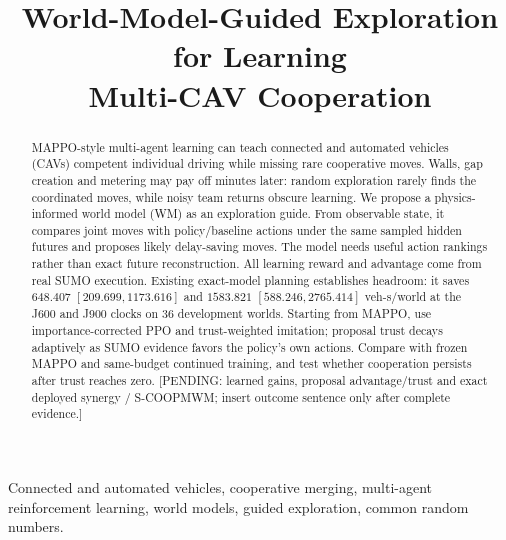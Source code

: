 \documentclass[conference]{IEEEtran}
\newcommand{\pending}[1]{\textcolor{red!80!black}{[PENDING: #1]}}
\begin{document}
\title{World-Model-Guided Exploration for Learning\\Multi-CAV Cooperation}
\author{
}
\maketitle

\begin{abstract}
MAPPO-style multi-agent learning can teach connected and automated vehicles
(CAVs) competent individual driving while missing rare cooperative moves.
Walls, gap creation and metering may pay off minutes later: random exploration
rarely finds the coordinated moves, while noisy team returns obscure learning.
We propose a physics-informed world model (WM) as an exploration guide.
From observable state, it compares joint moves with policy/baseline actions
under the same sampled hidden futures and proposes likely delay-saving moves.
The model needs useful action rankings rather than exact future reconstruction.
All learning reward and advantage come from real SUMO execution.
Existing exact-model planning establishes
headroom: it saves
$648.407$ $[209.699,1173.616]$ and $1583.821$ $[588.246,2765.414]$
veh-s/world at the J600 and J900 clocks on $36$ development worlds.
Starting from MAPPO, use importance-corrected PPO and trust-weighted imitation;
proposal trust decays adaptively as SUMO evidence favors the policy's own
actions. Compare with frozen MAPPO and same-budget continued training, and
test whether cooperation persists after trust reaches zero.
\pending{learned gains, proposal advantage/trust and exact deployed synergy /
S-COOPMWM; insert outcome sentence only after complete evidence.}
\end{abstract}

\begin{IEEEkeywords}
Connected and automated vehicles, cooperative merging, multi-agent reinforcement
learning, world models, guided exploration, common random numbers.
\end{IEEEkeywords}
\end{document}
